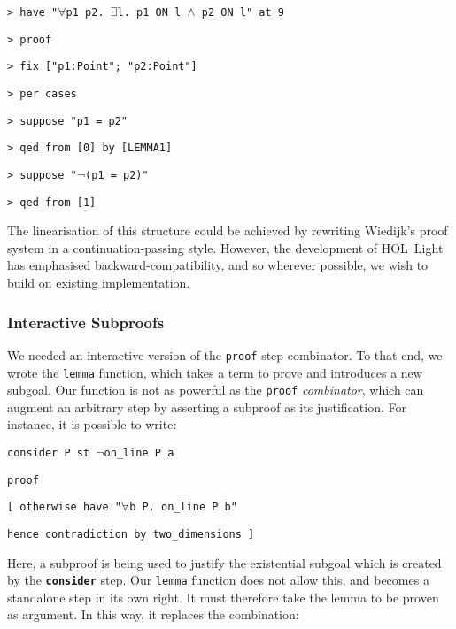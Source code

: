 \vspace{0.5cm}
\begin{minipage}{\linewidth}
  \footnotesize  
  \texttt{> have "$\forall$p1 p2. $\exists$l. p1 ON l $\wedge$ p2 ON l" at 9}

  \texttt{> proof}

  \texttt{> fix ["p1:Point"; "p2:Point"]}

  \texttt{> per cases}

  \texttt{> suppose "p1 = p2"}

  \texttt{> qed from [0] by [LEMMA1]}

  \texttt{> suppose "$\neg$(p1 = p2)"}

  \texttt{> qed from [1]}
\end{minipage}
\vspace{0.5cm}

The linearisation of this structure could be achieved by rewriting Wiedijk's proof system in a continuation-passing style. However, the development of HOL~Light has emphasised backward-compatibility, and so wherever possible, we wish to build on existing implementation.

\subsubsection{Interactive Subproofs}\label{sec:NewPrimitives}
 We needed an interactive version of the \texttt{proof} step combinator. To that end, we wrote the \texttt{lemma} function, which takes a term to prove and introduces a new subgoal. Our function is not as powerful as the \texttt{proof} \emph{combinator}, which can augment an arbitrary step by asserting a subproof as its justification. For instance, it is possible to write:

\vspace{0.5cm}
\begin{minipage}{10cm}
  \texttt{consider P st $\neg$on\_line P a}

  \texttt{proof}

  \texttt{[ otherwise have "$\forall$b P. on\_line P b"}

  \texttt{\enspace\enspace\enspace hence contradiction by two\_dimensions ]}
\end{minipage}
\vspace{0.5cm}

Here, a subproof is being used to justify the existential subgoal which is created by the \texttt{\bfseries{consider}} step. Our \texttt{lemma} function does not allow this, and becomes a standalone step in its own right. It must therefore take the lemma to be proven as argument. In this way, it replaces the combination:


